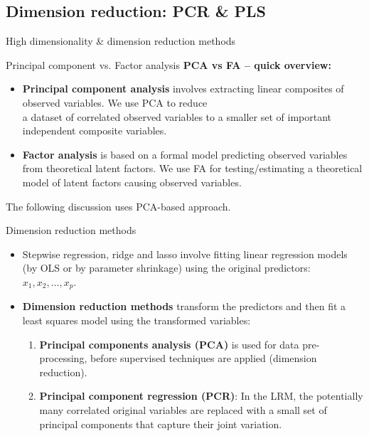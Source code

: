 \documentclass{beamer}
\begin{document}
\subsection{Dimension reduction: PCR \& PLS}
\begin{frame}{High dimensionality \& dimension reduction methods}
\end{frame}
\begin{frame}{Principal component vs. Factor analysis}
\textbf{PCA vs FA -- quick overview:}\\
\medskip
\begin{itemize}
\item \textbf{Principal component analysis} involves extracting linear composites of observed variables. We use PCA to reduce \\a dataset of correlated observed variables to a smaller set of important independent composite variables.
\bigskip
\item \textbf{Factor analysis} is based on a formal model predicting observed variables from theoretical latent factors. We use FA for testing/estimating a theoretical model of latent factors causing observed variables.
\end{itemize}
\bigskip
The following discussion uses PCA-based approach.
\end{frame}
\begin{frame}{Dimension reduction methods}
\begin{itemize}
\item Stepwise regression, ridge and lasso involve fitting linear regression models (by OLS or by parameter shrinkage) using the original predictors: $x_1, x_2, \dots , x_p$.
\medskip
\item \textbf{Dimension reduction methods} transform the
predictors and then fit a least squares model using the
transformed variables:
\begin{enumerate}
\bigskip
\item \textbf{Principal components analysis (PCA)} is used for data pre-processing, before supervised techniques are applied (dimension reduction).
\bigskip
\item \textbf{Principal component regression (PCR)}:  In the LRM, the potentially many correlated original variables are replaced with a small set of principal components that capture their joint variation.
\end{enumerate}
\end{itemize}
\end{frame}
\end{document}
